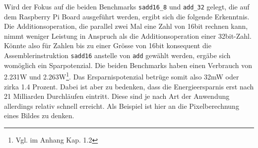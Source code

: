 Wird der Fokus auf die beiden Benchmarks \texttt{sadd16\_8} und \texttt{add\_32} gelegt, die auf dem Raspberry Pi Board ausgeführt werden, ergibt sich die folgende Erkenntnis. Die Additionsoperation, die parallel zwei Mal eine Zahl von 16bit rechnen kann, nimmt weniger Leistung in Anspruch als die Additionsoperation einer 32bit-Zahl. Könnte also für Zahlen bis zu einer Grösse von 16bit konsequent die Assemblerinstruktion \texttt{sadd16} anstelle von \texttt{add} gewählt werden, ergäbe sich womöglich ein Sparpotenzial. Die beiden Benchmarks haben einen Verbrauch von 2.231W und 2.263W\footnote{Vgl. im Anhang Kap. 1.2}. Das Ersparnispotenzial betrüge somit also 32mW oder zirka 1.4 Prozent. Dabei ist aber zu bedenken, dass die Energieersparnis erst nach 21 Milliarden Durchläufen eintritt. Diese sind je nach Art der Anwendung allerdings relativ schnell erreicht. Als Beispiel ist hier an die Pixelberechnung eines Bildes zu denken.
















